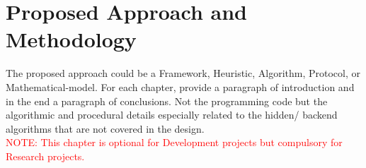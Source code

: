 \chapter{Proposed Approach and Methodology}
The proposed approach could be a Framework, Heuristic, Algorithm, Protocol, or Mathematical-model.
For each chapter, provide a paragraph of introduction and in the end a paragraph of conclusions. Not the programming code but the algorithmic and procedural details especially related to the hidden/ backend algorithms that are not covered in the design.\\
\textcolor{red}{NOTE: This chapter is optional for Development projects but compulsory for Research projects.} 

